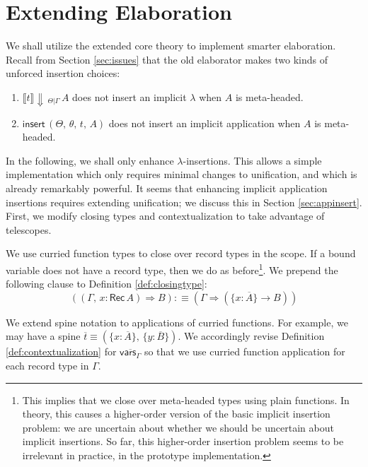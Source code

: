 \documentclass[acmsmall,review,anonymous,prologue,dvipsnames]{acmart}\settopmatter{printfolios=true,printccs=false,printacmref=false}
\newcommand{\To}{\Rightarrow}
\newcommand{\echeck}[4]{\llbracket#1\rrbracket\!\Downarrow\,_{#2|#3}\,#4}
\newcommand{\einsert}{\mathsf{insert}}
\newcommand{\Rec}{\mathsf{Rec}}
\newcommand{\ol}[1]{\overline{#1}}
\theoremstyle{remark}
\begin{document}
\section{Extending Elaboration}
\label{sec:extending_elaboration}

We shall utilize the extended core theory to implement smarter
elaboration. Recall from Section \ref{sec:issues} that the old elaborator makes
two kinds of unforced insertion choices:
\begin{enumerate}
\item $\echeck{t}{\Theta}{\Gamma}{A}$ does not insert an implicit $\lambda$ when $A$ is meta-headed.
\item $\einsert\,(\Theta,\,\theta,\,t,\,A)$ does not insert an implicit application when $A$ is meta-headed.
\end{enumerate}
In the following, we shall only enhance $\lambda$-insertions. This allows a
simple implementation which only requires minimal changes to unification, and
which is already remarkably powerful. It seems that enhancing implicit
application insertions requires extending unification; we discuss this in
Section \ref{sec:appinsert}. First, we modify closing types and
contextualization to take advantage of telescopes.

\begin{definition}
We use curried function types to close over record types in the scope. If a
bound variable does not have a record type, then we do as before\footnote{This
  implies that we close over meta-headed types using plain functions. In theory,
  this causes a higher-order version of the basic implicit insertion problem: we
  are uncertain about whether we should be uncertain about implicit
  insertions. So far, this higher-order insertion problem seems to be
  irrelevant in practice, in the prototype implementation.}. We prepend the
following clause to Definition
\ref{def:closingtype}:
\[
  ((\Gamma,\, x : \Rec\,A) \To B) :\equiv (\Gamma \To (\{x : \ol{A}\} \to B))
\]
\end{definition}
\begin{definition}[Contextualization]
We extend spine notation to applications of curried functions. For example, we
may have a spine $\ol{t} \equiv (\{x : \ol{A}\},\,\{y : \ol{B}\})$. We
accordingly revise Definition \ref{def:contextualization} for
$\overline{\mathsf{vars}_{\Gamma}}$ so that we use curried function application
for each record type in $\Gamma$.
\end{definition}
\end{document}
